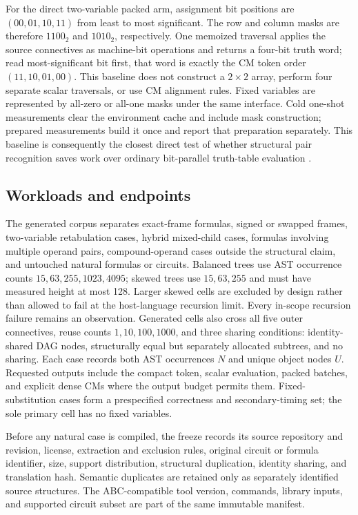 \documentclass[11pt]{article}
\begin{document}
For the direct two-variable packed arm, assignment bit positions are
$(00,01,10,11)$ from least to most significant. The row and column masks are
therefore $1100_2$ and $1010_2$, respectively. One memoized traversal applies
the source connectives as machine-bit operations and returns a four-bit truth
word; read most-significant bit first, that word is exactly the CM token order
$(11,10,01,00)$. This baseline does not construct a $2\times2$ array, perform
four separate scalar traversals, or use CM alignment rules. Fixed variables are
represented by all-zero or all-one masks under the same interface. Cold
one-shot measurements clear the environment cache and include mask
construction; prepared measurements build it once and report that preparation
separately. This baseline is consequently
the closest direct test of whether structural pair recognition saves work over
ordinary bit-parallel truth-table evaluation \citep{lee2022}.

\subsection{Workloads and endpoints}

The generated corpus separates exact-frame formulas, signed or swapped frames,
two-variable retabulation cases, hybrid mixed-child cases, formulas involving
multiple operand pairs, compound-operand cases outside the structural claim,
and untouched natural formulas or circuits. Balanced trees use AST occurrence
counts $15,63,255,1023,4095$; skewed trees use $15,63,255$ and must have measured
height at most 128. Larger skewed cells are excluded by design rather than
allowed to fail at the host-language recursion limit. Every in-scope recursion
failure remains an observation. Generated cells also cross all five outer
connectives, reuse counts $1,10,100,1000$, and three sharing conditions:
identity-shared DAG nodes, structurally equal but separately allocated
subtrees, and no sharing. Each case records both AST occurrences $N$ and unique
object nodes $U$. Requested outputs include the compact token, scalar
evaluation, packed batches, and explicit dense CMs where the output budget
permits them. Fixed-substitution cases form a prespecified correctness and
secondary-timing set; the sole primary cell has no fixed variables.

Before any natural case is compiled, the freeze records its source repository
and revision, license, extraction and exclusion rules, original circuit or
formula identifier, size, support distribution, structural duplication,
identity sharing, and translation hash. Semantic duplicates are retained only
as separately identified source structures. The ABC-compatible tool version,
commands, library inputs, and supported circuit subset are part of the same
immutable manifest.
\end{document}
